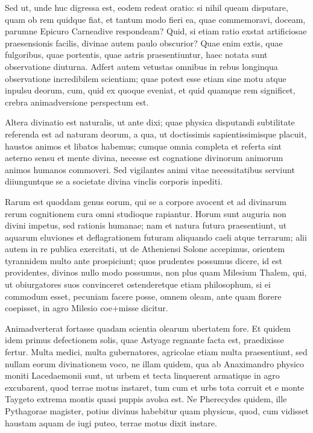  Sed ut, unde huc digressa est, eodem redeat oratio: si nihil queam disputare, quam ob rem quidque fiat, et tantum modo fieri ea, quae commemoravi, doceam, parumne Epicuro Carneadive respondeam? Quid, si etiam ratio exstat artificiosae praesensionis facilis, divinae autem paulo obscurior? Quae enim extis, quae fulgoribus, quae portentis, quae astris praesentiuntur, haec notata sunt observatione diuturna. Adfert autem vetustas omnibus in rebus longinqua observatione incredibilem scientiam; quae potest esse etiam sine motu atque inpulsu deorum, cum, quid ex quoque eveniat, et quid quamque rem significet, crebra animadversione perspectum est.

 Altera divinatio est naturalis, ut ante dixi; quae physica disputandi subtilitate referenda est ad naturam deorum, a qua, ut doctissimis sapientissimisque placuit, haustos animos et libatos habemus; cumque omnia completa et referta sint aeterno sensu et mente divina, necesse est cognatione divinorum animorum animos humanos commoveri. Sed vigilantes animi vitae necessitatibus serviunt diiunguntque se a societate divina vinclis corporis inpediti.

 Rarum est quoddam genus eorum, qui se a corpore avocent et ad divinarum rerum cognitionem cura omni studioque rapiantur. Horum sunt auguria non divini impetus, sed rationis humanae; nam et natura futura praesentiunt, ut aquarum eluviones et deflagrationem futuram aliquando caeli atque terrarum; alii autem in re publica exercitati, ut de Atheniensi Solone accepimus, orientem tyrannidem multo ante prospiciunt; quos prudentes possumus dicere, id est providentes, divinos nullo modo possumus, non plus quam Milesium Thalem, qui, ut obiurgatores suos convinceret ostenderetque etiam philosophum, si ei commodum esset, pecuniam facere posse, omnem oleam, ante quam florere coepisset, in agro Milesio coe+misse dicitur.

 Animadverterat fortasse quadam scientia olearum ubertatem fore. Et quidem idem primus defectionem solis, quae Astyage regnante facta est, praedixisse fertur. Multa medici, multa gubernatores, agricolae etiam multa praesentiunt, sed nullam eorum divinationem voco, ne illam quidem, qua ab Anaximandro physico moniti Lacedaemonii sunt, ut urbem et tecta linquerent armatique in agro excubarent, quod terrae motus instaret, tum cum et urbs tota corruit et e monte Taygeto extrema montis quasi puppis avolsa est. Ne Pherecydes quidem, ille Pythagorae magister, potius divinus habebitur quam physicus, quod, cum vidisset haustam aquam de iugi puteo, terrae motus dixit instare.

